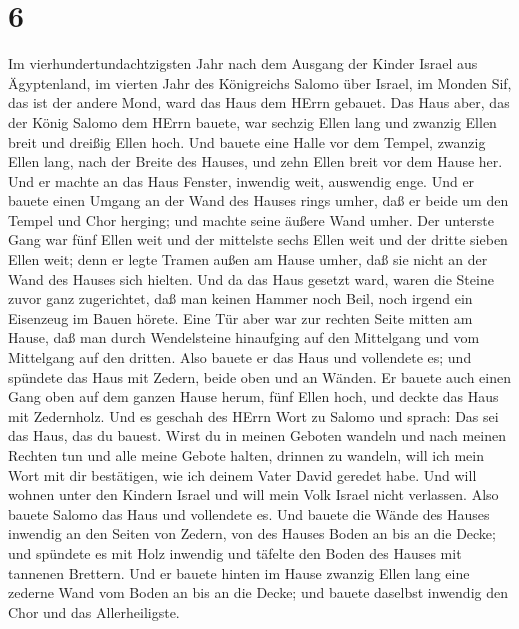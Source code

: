 \hypertarget{section-5}{%
\section{6}\label{section-5}}

 Im vierhundertundachtzigsten Jahr nach dem Ausgang der
Kinder Israel aus Ägyptenland, im vierten Jahr des Königreichs Salomo
über Israel, im Monden Sif, das ist der andere Mond, ward das Haus dem
HErrn gebauet.  Das Haus aber, das der König Salomo dem
HErrn bauete, war sechzig Ellen lang und zwanzig Ellen breit und dreißig
Ellen hoch.  Und bauete eine Halle vor dem Tempel, zwanzig
Ellen lang, nach der Breite des Hauses, und zehn Ellen breit vor dem
Hause her.  Und er machte an das Haus Fenster, inwendig
weit, auswendig enge.  Und er bauete einen Umgang an der
Wand des Hauses rings umher, daß er beide um den Tempel und Chor
herging; und machte seine äußere Wand umher.  Der unterste
Gang war fünf Ellen weit und der mittelste sechs Ellen weit und der
dritte sieben Ellen weit; denn er legte Tramen außen am Hause umher, daß
sie nicht an der Wand des Hauses sich hielten.  Und da das
Haus gesetzt ward, waren die Steine zuvor ganz zugerichtet, daß man
keinen Hammer noch Beil, noch irgend ein Eisenzeug im Bauen hörete.
 Eine Tür aber war zur rechten Seite mitten am Hause, daß
man durch Wendelsteine hinaufging auf den Mittelgang und vom Mittelgang
auf den dritten.  Also bauete er das Haus und vollendete es;
und spündete das Haus mit Zedern, beide oben und an Wänden.
 Er bauete auch einen Gang oben auf dem ganzen Hause herum,
fünf Ellen hoch, und deckte das Haus mit Zedernholz.  Und
es geschah des HErrn Wort zu Salomo und sprach:  Das sei
das Haus, das du bauest. Wirst du in meinen Geboten wandeln und nach
meinen Rechten tun und alle meine Gebote halten, drinnen zu wandeln,
will ich mein Wort mit dir bestätigen, wie ich deinem Vater David
geredet habe.  Und will wohnen unter den Kindern Israel und
will mein Volk Israel nicht verlassen.  Also bauete Salomo
das Haus und vollendete es.  Und bauete die Wände des
Hauses inwendig an den Seiten von Zedern, von des Hauses Boden an bis an
die Decke; und spündete es mit Holz inwendig und täfelte den Boden des
Hauses mit tannenen Brettern.  Und er bauete hinten im
Hause zwanzig Ellen lang eine zederne Wand vom Boden an bis an die
Decke; und bauete daselbst inwendig den Chor und das Allerheiligste.
